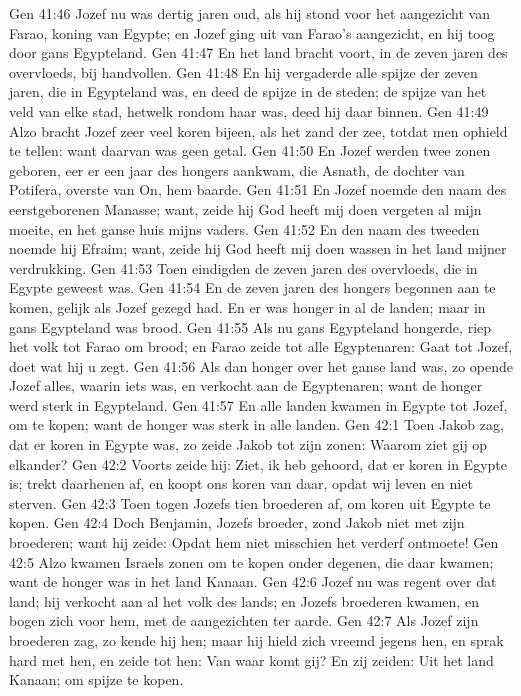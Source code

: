 Gen 41:46  Jozef nu was dertig jaren oud, als hij stond voor het aangezicht van Farao, koning van Egypte; en Jozef ging uit van Farao's aangezicht, en hij toog door gans Egypteland.
Gen 41:47  En het land bracht voort, in de zeven jaren des overvloeds, bij handvollen.
Gen 41:48  En hij vergaderde alle spijze der zeven jaren, die in Egypteland was, en deed de spijze in de steden; de spijze van het veld van elke stad, hetwelk rondom haar was, deed hij daar binnen.
Gen 41:49  Alzo bracht Jozef zeer veel koren bijeen, als het zand der zee, totdat men ophield te tellen: want daarvan was geen getal.
Gen 41:50  En Jozef werden twee zonen geboren, eer er een jaar des hongers aankwam, die Asnath, de dochter van Potifera, overste van On, hem baarde.
Gen 41:51  En Jozef noemde den naam des eerstgeborenen Manasse; want, zeide hij God heeft mij doen vergeten al mijn moeite, en het ganse huis mijns vaders.
Gen 41:52  En den naam des tweeden noemde hij Efraim; want, zeide hij God heeft mij doen wassen in het land mijner verdrukking.
Gen 41:53  Toen eindigden de zeven jaren des overvloeds, die in Egypte geweest was.
Gen 41:54  En de zeven jaren des hongers begonnen aan te komen, gelijk als Jozef gezegd had. En er was honger in al de landen; maar in gans Egypteland was brood.
Gen 41:55  Als nu gans Egypteland hongerde, riep het volk tot Farao om brood; en Farao zeide tot alle Egyptenaren: Gaat tot Jozef, doet wat hij u zegt.
Gen 41:56  Als dan honger over het ganse land was, zo opende Jozef alles, waarin iets was, en verkocht aan de Egyptenaren; want de honger werd sterk in Egypteland.
Gen 41:57  En alle landen kwamen in Egypte tot Jozef, om te kopen; want de honger was sterk in alle landen.
Gen 42:1  Toen Jakob zag, dat er koren in Egypte was, zo zeide Jakob tot zijn zonen: Waarom ziet gij op elkander?
Gen 42:2  Voorts zeide hij: Ziet, ik heb gehoord, dat er koren in Egypte is; trekt daarhenen af, en koopt ons koren van daar, opdat wij leven en niet sterven.
Gen 42:3  Toen togen Jozefs tien broederen af, om koren uit Egypte te kopen.
Gen 42:4  Doch Benjamin, Jozefs broeder, zond Jakob niet met zijn broederen; want hij zeide: Opdat hem niet misschien het verderf ontmoete!
Gen 42:5  Alzo kwamen Israels zonen om te kopen onder degenen, die daar kwamen; want de honger was in het land Kanaan.
Gen 42:6  Jozef nu was regent over dat land; hij verkocht aan al het volk des lands; en Jozefs broederen kwamen, en bogen zich voor hem, met de aangezichten ter aarde.
Gen 42:7  Als Jozef zijn broederen zag, zo kende hij hen; maar hij hield zich vreemd jegens hen, en sprak hard met hen, en zeide tot hen: Van waar komt gij? En zij zeiden: Uit het land Kanaan; om spijze te kopen.
